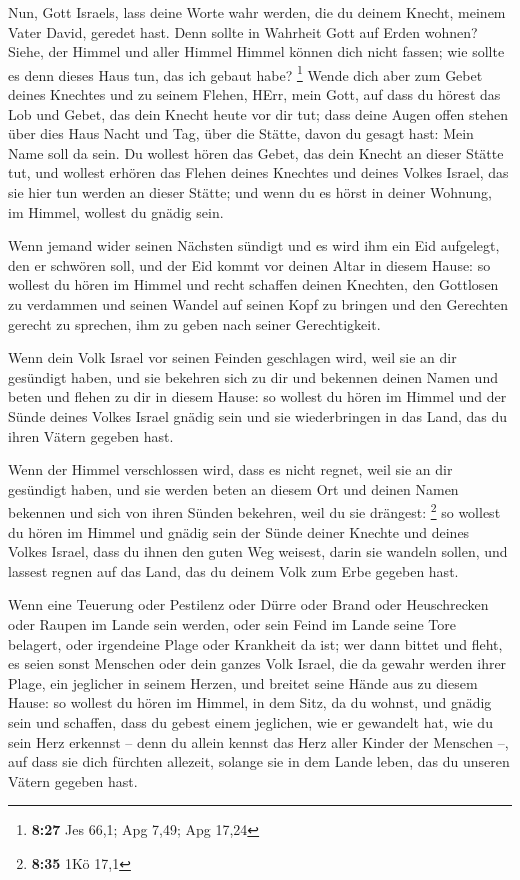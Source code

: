  Nun, Gott Israels, lass deine Worte wahr werden, die du
deinem Knecht, meinem Vater David, geredet hast.  Denn
sollte in Wahrheit Gott auf Erden wohnen? Siehe, der Himmel und aller
Himmel Himmel können dich nicht fassen; wie sollte es denn dieses Haus
tun, das ich gebaut habe? \footnote{\textbf{8:27} Jes 66,1; Apg 7,49;
  Apg 17,24}  Wende dich aber zum Gebet deines Knechtes und
zu seinem Flehen, HErr, mein Gott, auf dass du hörest das Lob und Gebet,
das dein Knecht heute vor dir tut;  dass deine Augen offen
stehen über dies Haus Nacht und Tag, über die Stätte, davon du gesagt
hast: Mein Name soll da sein. Du wollest hören das Gebet, das dein
Knecht an dieser Stätte tut,  und wollest erhören das
Flehen deines Knechtes und deines Volkes Israel, das sie hier tun werden
an dieser Stätte; und wenn du es hörst in deiner Wohnung, im Himmel,
wollest du gnädig sein.

 Wenn jemand wider seinen Nächsten sündigt und es wird ihm
ein Eid aufgelegt, den er schwören soll, und der Eid kommt vor deinen
Altar in diesem Hause:  so wollest du hören im Himmel und
recht schaffen deinen Knechten, den Gottlosen zu verdammen und seinen
Wandel auf seinen Kopf zu bringen und den Gerechten gerecht zu sprechen,
ihm zu geben nach seiner Gerechtigkeit.

 Wenn dein Volk Israel vor seinen Feinden geschlagen wird,
weil sie an dir gesündigt haben, und sie bekehren sich zu dir und
bekennen deinen Namen und beten und flehen zu dir in diesem Hause:
 so wollest du hören im Himmel und der Sünde deines Volkes
Israel gnädig sein und sie wiederbringen in das Land, das du ihren
Vätern gegeben hast.

 Wenn der Himmel verschlossen wird, dass es nicht regnet,
weil sie an dir gesündigt haben, und sie werden beten an diesem Ort und
deinen Namen bekennen und sich von ihren Sünden bekehren, weil du sie
drängest: \footnote{\textbf{8:35} 1Kö 17,1}  so wollest du
hören im Himmel und gnädig sein der Sünde deiner Knechte und deines
Volkes Israel, dass du ihnen den guten Weg weisest, darin sie wandeln
sollen, und lassest regnen auf das Land, das du deinem Volk zum Erbe
gegeben hast.

 Wenn eine Teuerung oder Pestilenz oder Dürre oder Brand
oder Heuschrecken oder Raupen im Lande sein werden, oder sein Feind im
Lande seine Tore belagert, oder irgendeine Plage oder Krankheit da ist;
 wer dann bittet und fleht, es seien sonst Menschen oder
dein ganzes Volk Israel, die da gewahr werden ihrer Plage, ein jeglicher
in seinem Herzen, und breitet seine Hände aus zu diesem Hause:
 so wollest du hören im Himmel, in dem Sitz, da du wohnst,
und gnädig sein und schaffen, dass du gebest einem jeglichen, wie er
gewandelt hat, wie du sein Herz erkennst -- denn du allein kennst das
Herz aller Kinder der Menschen --,  auf dass sie dich
fürchten allezeit, solange sie in dem Lande leben, das du unseren Vätern
gegeben hast.

